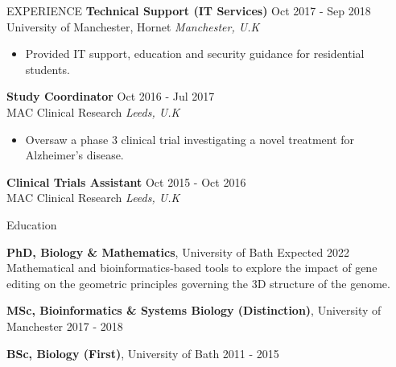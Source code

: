 \documentclass{cv} %
\begin{document}
\begin{rSection}{EXPERIENCE}
\textbf{Technical Support (IT Services)} \hfill Oct 2017 - Sep 2018 \\
University of Manchester, Hornet \hfill \textit{Manchester, U.K}
 \begin{itemize}
    \itemsep -3pt {} 
    \item Provided IT support, education and security guidance for residential students.
 \end{itemize}

\textbf{Study Coordinator} \hfill Oct 2016 - Jul 2017 \\
MAC Clinical Research \hfill \textit{Leeds, U.K}
 \begin{itemize}
    \itemsep -3pt {} 
    \item Oversaw a phase 3 clinical trial investigating a novel treatment for Alzheimer’s disease.
 \end{itemize}

\textbf{Clinical Trials Assistant} \hfill Oct 2015 - Oct 2016 \\
MAC Clinical Research \hfill \textit{Leeds, U.K}

\end{rSection} 


\begin{rSection}{Education}

{\bf PhD, Biology \& Mathematics}, University of Bath \hfill {Expected 2022} \\
Mathematical and bioinformatics-based tools to explore the impact of gene editing on the geometric principles governing the 3D structure of the genome.

{\bf MSc, Bioinformatics \& Systems Biology (Distinction)}, University of Manchester \hfill {2017 - 2018}

{\bf BSc, Biology (First)}, University of Bath \hfill {2011 - 2015}

\end{rSection}

\end{document}
